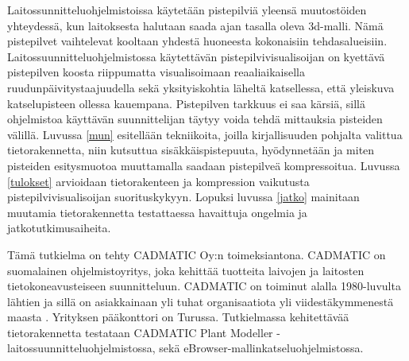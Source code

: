 Laitossunnitteluohjelmistoissa käytetään pistepilviä yleensä muutostöiden yhteydessä, kun laitoksesta halutaan saada ajan tasalla oleva 3d-malli. Nämä pistepilvet vaihtelevat kooltaan yhdestä huoneesta kokonaisiin tehdasalueisiin. Laitossuunnitteluohjelmistossa käytettävän pistepilvivisualisoijan on kyettävä pistepilven koosta riippumatta visualisoimaan reaaliaikaisella ruudunpäivitystaajuudella sekä yksityiskohtia läheltä katsellessa, että yleiskuva katselupisteen ollessa kauempana. Pistepilven tarkkuus ei saa kärsiä, sillä ohjelmistoa käyttävän suunnittelijan täytyy voida tehdä mittauksia pisteiden välillä. Luvussa \ref{mun} esitellään tekniikoita, joilla kirjallisuuden pohjalta valittua tietorakennetta, niin kutsuttua sisäkkäispistepuuta, hyödynnetään ja miten pisteiden esitysmuotoa muuttamalla saadaan pistepilveä kompressoitua. Luvussa \ref{tulokset} arvioidaan tietorakenteen ja kompression vaikutusta pistepilvivisualisoijan suorituskykyyn. Lopuksi luvussa \ref{jatko} mainitaan muutamia tietorakennetta testattaessa havaittuja ongelmia ja jatkotutkimusaiheita.

Tämä tutkielma on tehty CADMATIC Oy:n toimeksiantona. CADMATIC on suomalainen ohjelmistoyritys, joka kehittää tuotteita laivojen ja laitosten tietokoneavusteiseen suunnitteluun. CADMATIC on toiminut alalla 1980-luvulta lähtien ja sillä on asiakkainaan yli tuhat organisaatiota yli viidestäkymmenestä maasta \cite{cadmatic}. Yrityksen pääkonttori on Turussa. Tutkielmassa kehitettävää tietorakennetta testataan CADMATIC Plant Modeller -laitossuunnitteluohjelmistossa, sekä eBrowser-mallinkatseluohjelmistossa. 